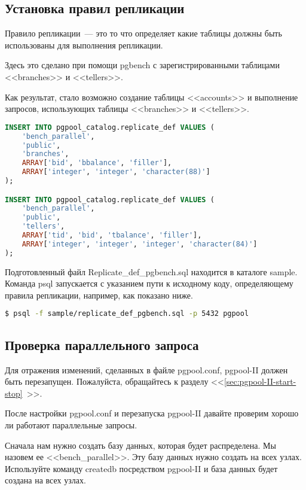 \subsection{Установка правил репликации}

Правило репликации~--- это то что определяет какие таблицы должны быть использованы для выполнения репликации.

Здесь это сделано при помощи pgbench с зарегистрированными таблицами <<branches>> и <<tellers>>.

Как результат, стало возможно создание таблицы <<accounts>> и выполнение запросов, использующих таблицы <<branches>> и <<tellers>>.

\begin{lstlisting}[language=SQL,label=lst:pgpool35,caption=Установка правил репликации]
INSERT INTO pgpool_catalog.replicate_def VALUES (
    'bench_parallel',
    'public',
    'branches',
    ARRAY['bid', 'bbalance', 'filler'],
    ARRAY['integer', 'integer', 'character(88)']
);

INSERT INTO pgpool_catalog.replicate_def VALUES (
    'bench_parallel',
    'public',
    'tellers',
    ARRAY['tid', 'bid', 'tbalance', 'filler'],
    ARRAY['integer', 'integer', 'integer', 'character(84)']
);
\end{lstlisting}

Подготовленный файл Replicate\_def\_pgbench.sql находится в каталоге sample. Команда psql запускается с указанием пути к исходному коду, определяющему правила репликации, например, как показано ниже.

\begin{lstlisting}[language=Bash,label=lst:pgpool36,caption=Установка правил репликации]
$ psql -f sample/replicate_def_pgbench.sql -p 5432 pgpool
\end{lstlisting}

\subsection{Проверка параллельного запроса}

Для отражения изменений, сделанных в файле pgpool.conf, pgpool-II должен быть перезапущен. Пожалуйста, обращайтесь к разделу <<\ref{sec:pgpool-II-start-stop}~>>.

После настройки pgpool.conf и перезапуска pgpool-II давайте проверим хорошо ли работают параллельные запросы.

Сначала нам нужно создать базу данных, которая будет распределена. Мы назовем ее <<bench\_parallel>>. Эту базу данных нужно создать на всех узлах. Используйте команду createdb посредством pgpool-II и база данных будет создана на всех узлах.

